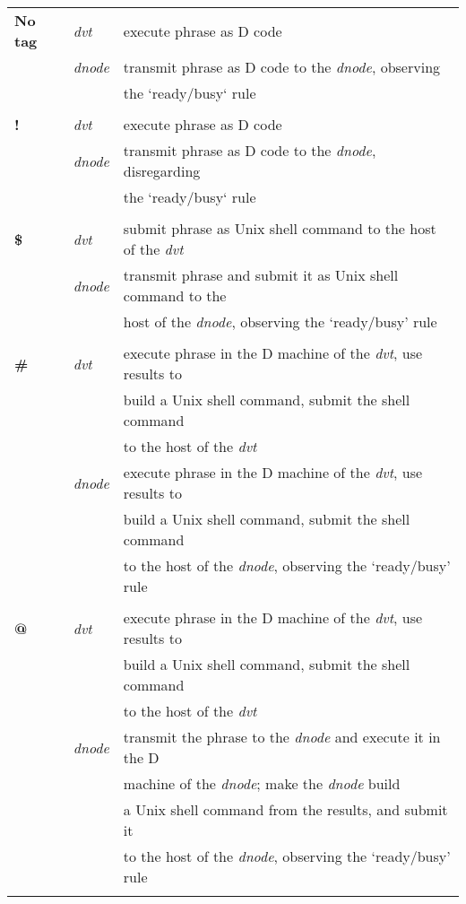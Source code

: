 \begin{tabular}{>{\sffamily\bfseries}l>{\sffamily\itshape}l>{\sffamily}l}

No tag & dvt & execute phrase as D code\\
&        dnode & transmit phrase as D code to the \emph{dnode}, observing\\
&              & the `ready/busy` rule\\\\
! & dvt & execute phrase as D code\\
  & dnode & transmit phrase as D code to the \emph{dnode}, disregarding\\
  &       & the `ready/busy` rule\\\\ 
\$ & dvt & submit phrase as Unix shell command to the host of the \emph{dvt}\\
   & dnode & transmit phrase and submit it as Unix shell command to the\\
   &       & host of the \emph{dnode}, observing the `ready/busy' rule\\\\
\# & dvt & execute phrase in the D machine of the \emph{dvt}, use results to\\
   &     & build a Unix shell command, submit the shell command\\
   &     & to the host of the \emph{dvt}\\
   & dnode & execute phrase in the D machine of the \emph{dvt}, use results to\\
   &     & build a Unix shell command, submit the shell command\\
   &     &  to the host of the \emph{dnode}, observing the `ready/busy' rule\\\\
@ & dvt & execute phrase in the D machine of the \emph{dvt}, use results to\\
  &     & build a Unix shell command, submit the shell command\\
  &     &  to the host of the \emph{dvt}\\
  & dnode & transmit the phrase to the \emph{dnode} and execute it in the D\\
  &       & machine of the \emph{dnode}; make the \emph{dnode} build\\
  &       & a Unix shell command from the results, and submit it\\
  &       &  to the host of the \emph{dnode}, observing the `ready/busy' rule\\\\
\end{tabular}


